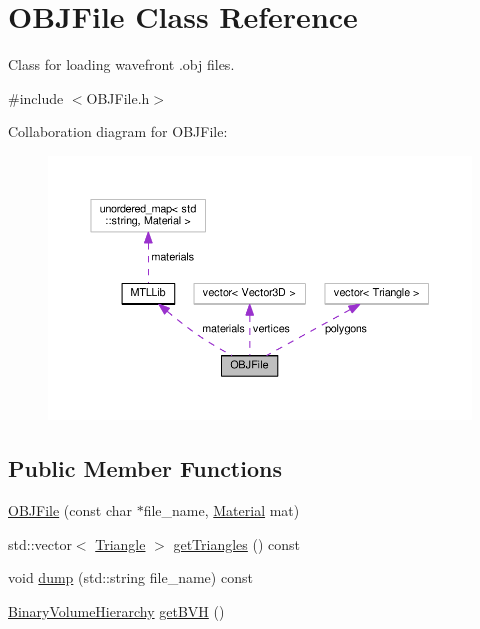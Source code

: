 \hypertarget{classOBJFile}{}\section{O\+B\+J\+File Class Reference}
\label{classOBJFile}


Class for loading wavefront .obj files.  




{\ttfamily \#include $<$O\+B\+J\+File.\+h$>$}



Collaboration diagram for O\+B\+J\+File\+:\nopagebreak
\begin{figure}[H]
\begin{center}
\leavevmode
\includegraphics[width=350pt]{classOBJFile__coll__graph}
\end{center}
\end{figure}
\subsection*{Public Member Functions}
\begin{DoxyCompactItemize}
\item 
\hyperlink{classOBJFile_ac6c14cded889593868aaab4e7d3e4bfb}{O\+B\+J\+File} (const char $\ast$file\+\_\+name, \hyperlink{classMaterial}{Material} mat)
\item 
std\+::vector$<$ \hyperlink{classTriangle}{Triangle} $>$ \hyperlink{classOBJFile_ad3d4291c00693d8cfcca416ac4ad7e03}{get\+Triangles} () const 
\item 
void \hyperlink{classOBJFile_afb445848916f5a138b262d7fcb0e136f}{dump} (std\+::string file\+\_\+name) const 
\item 
\hyperlink{classBinaryVolumeHierarchy}{Binary\+Volume\+Hierarchy} \hyperlink{classOBJFile_ae3128b473a8b7b837364cc9688cb89dc}{get\+B\+VH} ()
\end{DoxyCompactItemize}
